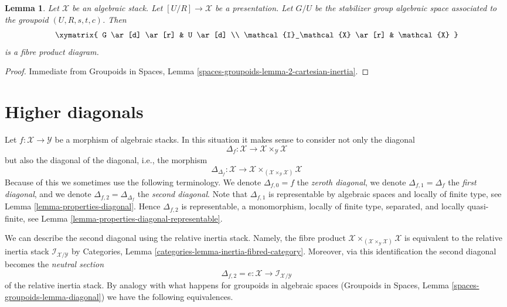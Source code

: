 \documentclass{stacks-project}
\theoremstyle{plain}
\newtheorem{lemma}[subsection]{Lemma}
\theoremstyle{definition}
\theoremstyle{remark}
\numberwithin{equation}{subsection}
\begin{document}
\begin{lemma}
\label{lemma-presentation-inertia}
Let $\mathcal{X}$ be an algebraic stack. Let $[U/R] \to \mathcal{X}$
be a presentation. Let $G/U$ be the stabilizer group algebraic space
associated to the groupoid $(U, R, s, t, c)$. Then
$$
\xymatrix{
G \ar[d] \ar[r] & U \ar[d] \\
\mathcal{I}_\mathcal{X} \ar[r] & \mathcal{X}
}
$$
is a fibre product diagram.
\end{lemma}

\begin{proof}
Immediate from
Groupoids in Spaces, Lemma \ref{spaces-groupoids-lemma-2-cartesian-inertia}.
\end{proof}









\section{Higher diagonals}
\label{section-higher-diagonals}

\noindent
Let $f : \mathcal{X} \to \mathcal{Y}$ be a morphism of algebraic stacks.
In this situation it makes sense to consider not only the diagonal
$$
\Delta_f : \mathcal{X} \to \mathcal{X} \times_\mathcal{Y} \mathcal{X}
$$
but also the diagonal of the diagonal, i.e., the morphism
$$
\Delta_{\Delta_f} :
\mathcal{X}
\longrightarrow
\mathcal{X} \times_{(\mathcal{X} \times_\mathcal{Y} \mathcal{X})} \mathcal{X}
$$
Because of this we sometimes use the following terminology. We denote
$\Delta_{f, 0} = f$ the {\it zeroth diagonal},
we denote $\Delta_{f, 1} = \Delta_f$ the {\it first diagonal}, and
we denote $\Delta_{f, 2} = \Delta_{\Delta_f}$ the {\it second diagonal}.
Note that $\Delta_{f, 1}$ is representable by algebraic spaces and locally of
finite type, see
Lemma \ref{lemma-properties-diagonal}.
Hence $\Delta_{f, 2}$ is representable, a monomorphism, locally of finite type,
separated, and locally quasi-finite, see
Lemma \ref{lemma-properties-diagonal-representable}.

\medskip\noindent
We can describe the second diagonal using the relative inertia stack.
Namely, the fibre product
$\mathcal{X}
\times_{(\mathcal{X} \times_\mathcal{Y} \mathcal{X})} \mathcal{X}$
is equivalent to the relative inertia stack
$\mathcal{I}_{\mathcal{X}/\mathcal{Y}}$ by
Categories, Lemma \ref{categories-lemma-inertia-fibred-category}.
Moreover, via this identification the second diagonal becomes the
{\it neutral section}
$$
\Delta_{f, 2} = e : \mathcal{X} \to \mathcal{I}_{\mathcal{X}/\mathcal{Y}}
$$
of the relative inertia stack. By analogy with what happens for
groupoids in algebraic spaces
(Groupoids in Spaces, Lemma \ref{spaces-groupoids-lemma-diagonal})
we have the following equivalences.
\end{document}
